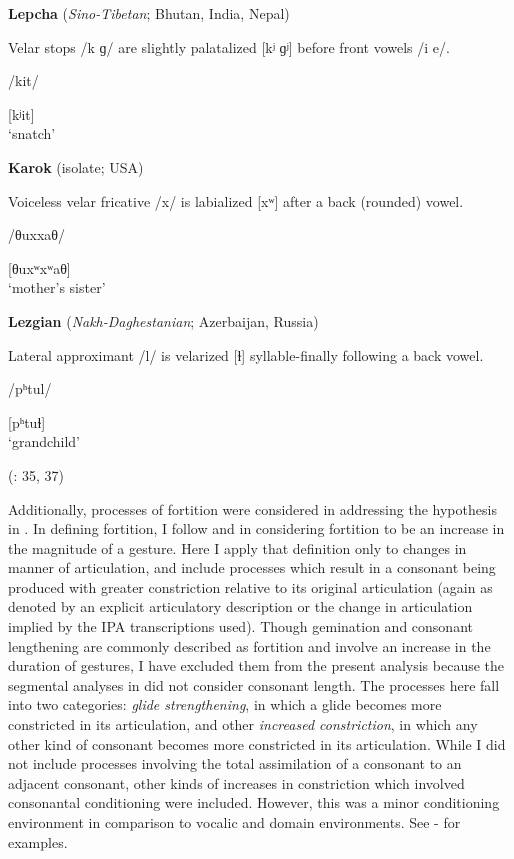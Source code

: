 \ea\label{ex:7.6}
  \textbf{Lepcha} (\textit{Sino-Tibetan}; Bhutan, India, Nepal)

Velar stops /k ɡ/ are slightly palatalized [kʲ ɡʲ] before front vowels /i e/.

/kit/

[kʲit]\\
\glt ‘snatch’
\citep[21]{Plaisier2007}
\z

\ea\label{ex:7.7}
  \textbf{Karok} (isolate; USA)

Voiceless velar fricative /x/ is labialized [xʷ] after a back (rounded) vowel.

/θuxxaθ/

[θuxʷxʷaθ]\\
\glt ‘mother’s sister’
\citep[8]{Bright1957}
\z

\ea\label{ex:7.8}
  \textbf{Lezgian} (\textit{Nakh-Daghestanian}; Azerbaijan, Russia)

Lateral approximant /l/ is velarized [ɫ] syllable-finally following a back vowel.

/pʰtul/

[pʰtuɫ]\\
\glt ‘grandchild’

(\citealt{Haspelmath1993}: 35, 37)
\z

  Additionally, processes of fortition were considered in addressing the hypothesis in . In defining fortition, I follow \citet{Bybee2015b} and \citet{BybeeEasterday2019} in considering fortition to be an increase in the magnitude of a gesture. Here I apply that definition only to changes in manner of articulation, and include processes which result in a consonant being produced with greater constriction relative to its original articulation (again as denoted by an explicit articulatory description or the change in articulation implied by the IPA transcriptions used). Though gemination and consonant lengthening are commonly described as fortition and involve an increase in the duration of gestures, I have excluded them from the present analysis because the segmental analyses in  did not consider consonant length. The processes here fall into two categories: \textit{glide strengthening}, in which a glide becomes more constricted in its articulation, and other \textit{increased constriction}, in which any other kind of consonant becomes more constricted in its articulation. While I did not include processes involving the total assimilation of a consonant to an adjacent consonant, other kinds of increases in constriction which involved consonantal conditioning were included. However, this was a minor conditioning environment in comparison to vocalic and domain environments. See - for examples.

